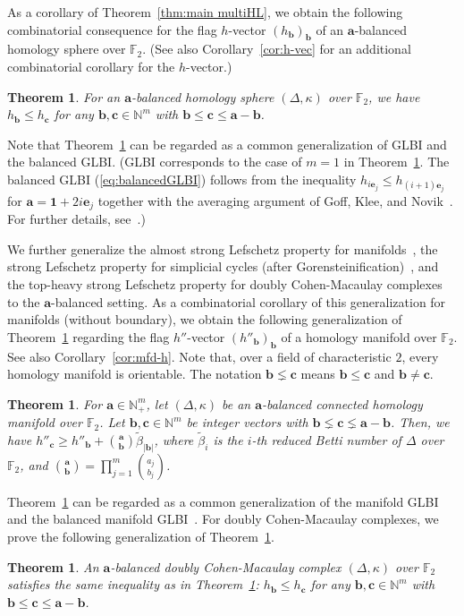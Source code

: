 \documentclass[11pt]{article}
\newtheorem{theorem}[theo]{Theorem}
\theoremstyle{definition}
\numberwithin{equation}{section}
\begin{document}
As a corollary of Theorem~\ref{thm:main multiHL}, we obtain the following combinatorial consequence for the flag $h$-vector $(h_{\bm{b}})_{\bm{b}}$ of an $\bm{a}$-balanced homology sphere over $\mathbb{F}_2$. (See also Corollary~\ref{cor:h-vec} for an additional combinatorial corollary for the $h$-vector.)
\begin{theorem} \label{thm:flag-h}
For an $\bm{a}$-balanced homology sphere $(\Delta,\kappa)$ over $\mathbb{F}_2$, we have $h_{\bm{b}} \leq h_{\bm{c}}$ for any $\bm{b},\bm{c} \in \mathbb{N}^m$ with $\bm{b} \leq \bm{c} \leq \bm{a}-\bm{b}$.
\end{theorem}
Note that Theorem~\ref{thm:flag-h} can be regarded as a common generalization of GLBI and the balanced GLBI. (GLBI corresponds to the case of $m=1$ in Theorem~\ref{thm:flag-h}. The balanced GLBI (\ref{eq:balancedGLBI}) follows from the inequality $h_{i\bm{e}_j}\leq h_{(i+1)\bm{e}_j}$ for $\bm{a}=\bm{1}+2i\bm{e}_j$ together with the averaging argument of Goff, Klee, and Novik~\cite{GKN}. For further details, see~\cite{Adi17,JM}.)

We further generalize the almost strong Lefschetz property for manifolds~\cite[Section 8]{AY}, the strong Lefschetz property for simplicial cycles (after Gorensteinification)~\cite[Theorem I]{APP}, and the top-heavy strong Lefschetz property for doubly Cohen-Macaulay complexes~\cite[Corollary 3.2]{APP} to the $\bm{a}$-balanced setting.
As a combinatorial corollary of this generalization for manifolds (without boundary), we obtain the following generalization of Theorem~\ref{thm:flag-h} regarding the flag $h''$-vector $(h''_{\bm{b}})_{\bm{b}}$ of a homology manifold over $\mathbb{F}_2$. See also Corollary~\ref{cor:mfd-h}. Note that, over a field of characteristic $2$, every homology manifold is orientable.
The notation $\bm{b} \lneq \bm{c}$ means $\bm{b} \leq \bm{c}$ and $\bm{b} \neq \bm{c}$.
\begin{theorem} \label{thm:manifold flag_h}
For $\bm{a} \in \mathbb{N}^m_+$, let $(\Delta,\kappa)$ be an $\bm{a}$-balanced connected homology manifold over $\mathbb{F}_2$.
Let $\bm{b}, \bm{c} \in \mathbb{N}^m$ be integer vectors with $\bm{b} \lneq \bm{c} \lneq \bm{a}-\bm{b}$.
Then, we have $h''_{\bm{c}} \geq h''_{\bm{b}}+ \binom{\bm{a}}{\bm{b}}\widetilde{\beta}_{|\bm{b}|}$, where $\widetilde{\beta}_i$ is the $i$-th reduced Betti number of $\Delta$ over $\mathbb{F}_2$, and $\binom{\bm{a}}{\bm{b}}=\prod_{j=1}^m \binom{a_j}{b_j}$.
\end{theorem}
Theorem~\ref{thm:manifold flag_h} can be regarded as a common generalization of the manifold GLBI~\cite{NS} and the balanced manifold GLBI~\cite{JMNS}.
For doubly Cohen-Macaulay complexes, we prove the following generalization of Theorem~\ref{thm:flag-h}.
\begin{theorem} \label{thm:2CM_flag h}
An $\bm{a}$-balanced doubly Cohen-Macaulay complex $(\Delta,\kappa)$ over $\mathbb{F}_2$ satisfies the same inequality as in Theorem~\ref{thm:flag-h}: $h_{\bm{b}} \leq h_{\bm{c}}$ for any $\bm{b},\bm{c} \in \mathbb{N}^m$ with $\bm{b} \leq \bm{c} \leq \bm{a}-\bm{b}$.
\end{theorem}
\end{document}
